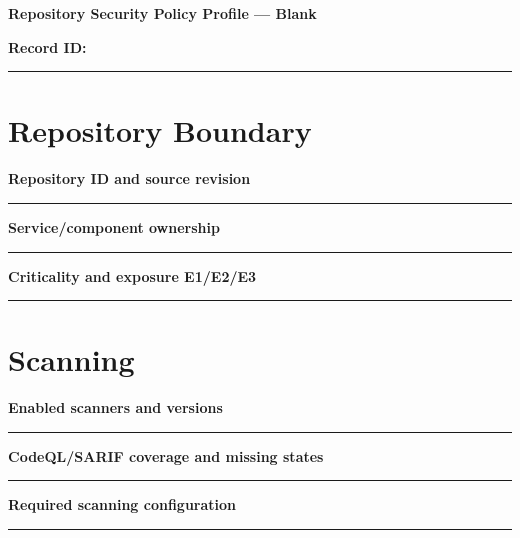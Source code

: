 \documentclass[11pt,letterpaper]{article}
\begin{document}
\begin{center}{\LARGE\bfseries Repository Security Policy Profile --- Blank}\par
\vspace{4pt}{\small Print-ready unfilled assessment instrument}\par
\end{center}
\noindent\textbf{Record ID:} \rule{2.6in}{0.4pt}\par
\section{Repository Boundary}
\noindent\textbf{Repository ID and source revision}\par
\vspace{1.1em}\noindent\rule{0.96\linewidth}{0.4pt}\par\vspace{0.65em}
\noindent\textbf{Service/component ownership}\par
\vspace{1.1em}\noindent\rule{0.96\linewidth}{0.4pt}\par\vspace{0.65em}
\noindent\textbf{Criticality and exposure E1/E2/E3}\par
\vspace{1.1em}\noindent\rule{0.96\linewidth}{0.4pt}\par\vspace{0.65em}
\section{Scanning}
\noindent\textbf{Enabled scanners and versions}\par
\vspace{1.1em}\noindent\rule{0.96\linewidth}{0.4pt}\par\vspace{0.65em}
\noindent\textbf{CodeQL/SARIF coverage and missing states}\par
\vspace{1.1em}\noindent\rule{0.96\linewidth}{0.4pt}\par\vspace{0.65em}
\noindent\textbf{Required scanning configuration}\par
\vspace{1.1em}\noindent\rule{0.96\linewidth}{0.4pt}\par\vspace{0.65em}
\end{document}
